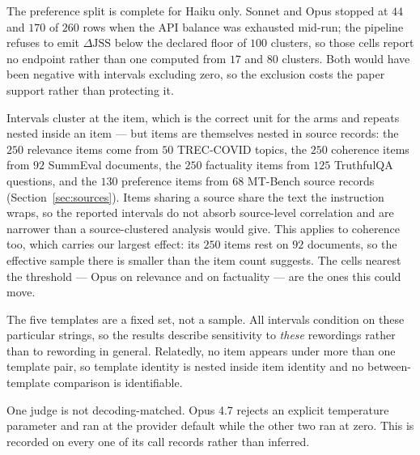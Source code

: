 The preference split is complete for Haiku only. Sonnet and Opus stopped at $44$
and $170$ of $260$ rows when the API balance was exhausted mid-run; the pipeline
refuses to emit $\Delta\mathrm{JSS}$ below the declared floor of $100$ clusters,
so those cells report no endpoint rather than one computed from $17$ and $80$
clusters. Both would have been negative with intervals excluding zero, so the
exclusion costs the paper support rather than protecting it.

Intervals cluster at the item, which is the correct unit for the arms and repeats
nested inside an item --- but items are themselves nested in source records: the
$250$ relevance items come from $50$ TREC-COVID topics, the $250$ coherence items
from $92$ SummEval documents, the $250$ factuality items from $125$ TruthfulQA
questions, and the $130$ preference items from $68$ MT-Bench source records
(Section~\ref{sec:sources}). Items sharing a source share the text the
instruction wraps, so the reported intervals do not absorb source-level
correlation and are narrower than a source-clustered analysis would give. This
applies to coherence too, which carries our largest effect: its $250$ items rest
on $92$ documents, so the effective sample there is smaller than the item count
suggests. The cells nearest the threshold --- Opus on relevance and on
factuality --- are the ones this could move.

The five templates are a fixed set, not a sample. All intervals condition on
these particular strings, so the results describe sensitivity to \emph{these}
rewordings rather than to rewording in general. Relatedly, no item appears under
more than one template pair, so template identity is nested inside item identity
and no between-template comparison is identifiable.

One judge is not decoding-matched. Opus 4.7 rejects an explicit temperature
parameter and ran at the provider default while the other two ran at zero. This
is recorded on every one of its call records rather than inferred.
